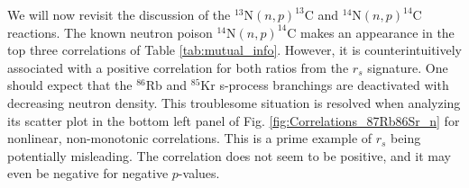 We will now revisit the discussion of the $^{13}\mathrm{N}(n,p)^{13}\mathrm{C}$ and $^{14}\mathrm{N}(n,p)^{14}\mathrm{C}$ reactions. The known neutron poison $^{14}\mathrm{N}(n,p)^{14}\mathrm{C}$ makes an appearance in the top three correlations of Table \ref{tab:mutual_info}. However, it is counterintuitively associated with a positive correlation for both ratios from the $r_{s}$ signature. One should expect that the $^{86}$Rb and $^{85}$Kr s-process branchings are deactivated with decreasing neutron density. This troublesome situation is resolved when analyzing its scatter plot in the bottom left panel of Fig. \ref{fig:Correlations_87Rb86Sr_n} for nonlinear, non-monotonic correlations. This is a prime example of $r_{s}$ being potentially misleading. The correlation does not seem to be positive, and it may even be negative for negative $p$-values.

